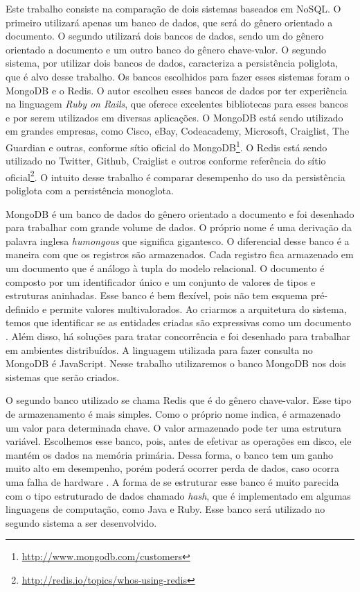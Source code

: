 Este trabalho consiste na comparação de dois sistemas baseados em NoSQL. O primeiro utilizará apenas um banco de dados, que será do gênero orientado a documento. O segundo utilizará dois bancos de dados, sendo um do gênero orientado a documento e um outro banco do gênero chave-valor. O segundo sistema, por utilizar dois bancos de dados, caracteriza a persistência poliglota, que é alvo desse trabalho. Os bancos escolhidos para fazer esses sistemas foram o MongoDB e o \ac{Redis}. O autor escolheu esses bancos de dados por ter experiência na linguagem \textit{Ruby on Rails}, que oferece excelentes bibliotecas para esses bancos e por serem utilizados em diversas aplicações. O MongoDB está sendo utilizado em grandes empresas, como Cisco, eBay, Codeacademy, Microsoft, Craiglist, The Guardian e outras, conforme sítio oficial do MongoDB\footnote{\url{http://www.mongodb.com/customers}}. O \ac{Redis} está sendo utilizado no Twitter, Github, Craiglist e outros conforme referência do sítio oficial\footnote{\url{http://redis.io/topics/whos-using-redis}}.
O intuito desse trabalho é comparar desempenho do uso da persistência poliglota  com a persistência monoglota.

MongoDB é um banco de dados do gênero orientado a documento e foi desenhado para trabalhar com grande volume de dados. O próprio nome é uma derivação da palavra inglesa \textit{humongous} que significa gigantesco. O diferencial desse banco é a maneira com que os registros são armazenados. Cada registro fica armazenado em um documento que é análogo à tupla do modelo relacional. O documento é composto por um identificador único e um conjunto de valores de tipos e estruturas aninhadas. Esse banco é bem flexível, pois não tem esquema pré-definido e permite valores multivalorados. Ao criarmos a arquitetura do sistema, temos que identificar se as entidades criadas são expressivas como um documento \cite{SDSW}. Além disso, há soluções para tratar concorrência e foi desenhado para trabalhar em ambientes distribuídos. A linguagem utilizada para fazer consulta no MongoDB é JavaScript. Nesse trabalho utilizaremos o banco MongoDB nos dois sistemas que serão criados.

O segundo banco utilizado se chama \ac{Redis} que é do gênero chave-valor. Esse tipo de armazenamento é mais simples. Como o próprio nome indica, é armazenado um valor para determinada chave. O valor armazenado pode ter uma estrutura variável. Escolhemos esse banco, pois, antes de efetivar as operações em disco, ele mantém os dados na memória primária. Dessa forma, o banco tem um ganho muito alto em desempenho, porém poderá ocorrer perda de dados, caso ocorra uma falha de hardware \cite{SDSW}. A forma de se estruturar esse banco é muito parecida com o tipo estruturado de dados chamado \textit{hash}, que é implementado em algumas linguagens de computação, como Java e Ruby. Esse banco será utilizado no segundo sistema a ser desenvolvido.


